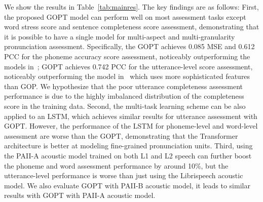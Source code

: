 \documentclass{article}
\begin{document}
We show the results in Table~\ref{tab:mainres}. The key findings are as follows: First, the proposed GOPT model can perform well on most assessment tasks except word stress score and sentence completeness score assessment, demonstrating that it is possible to have a single model for multi-aspect and multi-granularity pronunciation assessment. Specifically, the GOPT achieves 0.085 MSE and 0.612 PCC for the phoneme accuracy score assessment, noticeably outperforming the models in~\cite{zhang2021speechocean762}; GOPT achieves 0.742 PCC for the utterance-level score assessment, noticeably outperforming the model in~\cite{lin2021deep} which uses more sophisticated features than GOP. We hypothesize that the poor utterance completeness assessment performance is due to the highly imbalanced distribution of the completeness score in the training data. Second, the multi-task learning scheme can be also applied to an LSTM, which achieves similar results for utterance assessment with GOPT.  However, the performance of the LSTM for phoneme-level and word-level assessment are worse than the GOPT, demonstrating that the Transformer architecture is better at modeling fine-grained pronunciation units. Third, using the PAII-A acoustic model trained on both L1 and L2 speech can further boost the phoneme and word assessment performance by around 10\%, but the utterance-level performance is worse than just using the Librispeech acoustic model. We also evaluate GOPT with PAII-B acoustic model, it leads to similar results with GOPT with PAII-A acoustic model.
\end{document}
